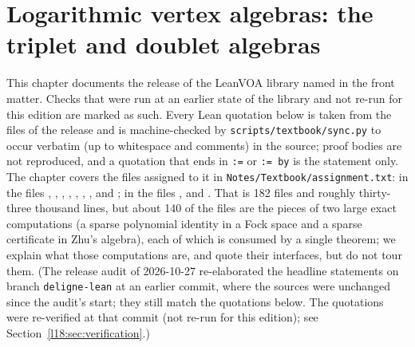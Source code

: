 \chapter{Logarithmic vertex algebras: the triplet and doublet algebras}\label{ch:L18}
\begingroup\setlength{\emergencystretch}{3em}

\providecommand{\leighteenvac}{\mathbf{1}}
\providecommand{\leighteenV}{\mathcal{V}}
\providecommand{\leighteenW}{\mathcal{W}}
\providecommand{\leighteenA}{\mathcal{A}}
\providecommand{\leighteenVL}{V_{L_p}}
\providecommand{\leighteenQ}{Q}
\providecommand{\leighteenO}{O}
\providecommand{\leighteenAtwo}{A_2}
\providecommand{\leighteenbar}[1]{\overline{#1}}
\providecommand{\leighteenSF}{\mathrm{SF}}
\providecommand{\leighteenHS}{T}

This chapter documents the release of the LeanVOA library named in the front matter. Checks that were run at an earlier state of the library and not re-run for this edition are
marked as such. Every Lean quotation below is taken from the files of the release and is
machine-checked by \texttt{scripts/textbook/sync.py} to occur verbatim (up to whitespace and
comments) in the source; proof bodies are not reproduced, and a quotation that ends in \texttt{:=}
or \texttt{:= by} is the statement only. The chapter covers the files assigned to it in
\texttt{Notes/Textbook/assignment.txt}: in  the files
, , ,
, , ,
,  and ; in
 the files ,
 and . That is 182 files and roughly
thirty-three thousand lines, but about 140 of the files are the pieces of two large exact computations
(a sparse polynomial identity in a Fock space and a sparse certificate in Zhu's algebra), each of
which is consumed by a single theorem; we explain what those computations are, and quote their
interfaces, but do not tour them. (The release audit of 2026-10-27 re-elaborated the headline statements on branch
\texttt{deligne-lean} at an earlier commit, where the  sources were unchanged since the audit's start;
they still match the quotations below. The quotations were re-verified at that commit (not re-run for this edition);
see Section~\ref{l18:sec:verification}.)

